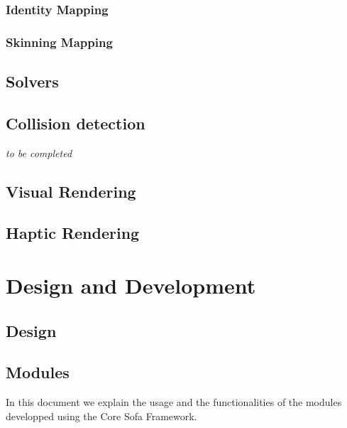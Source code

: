 \documentclass[a4paper,10pt]{report}
\begin{document}
\section{Identity Mapping}
\section{Skinning Mapping}


\chapter{Solvers}
\label{chap:solvers}
\graphicspath{{../solvers/}} 




\chapter{Collision detection}
\graphicspath{{../collision/}} 

\vspace{1cm}
\emph{to be completed}


\chapter{Visual Rendering}


\chapter{Haptic Rendering}
\label{chap:haptic}
\graphicspath{{../haptic/}} 


\pagebreak
\part{Design and Development}
\pagebreak

\chapter{Design}
\graphicspath{{../design/}}  %



\chapter{Modules}
\graphicspath{{../modules/}}  %
In this document we explain the usage and the functionalities of the modules developped using the Core Sofa Framework.

\end{document}
